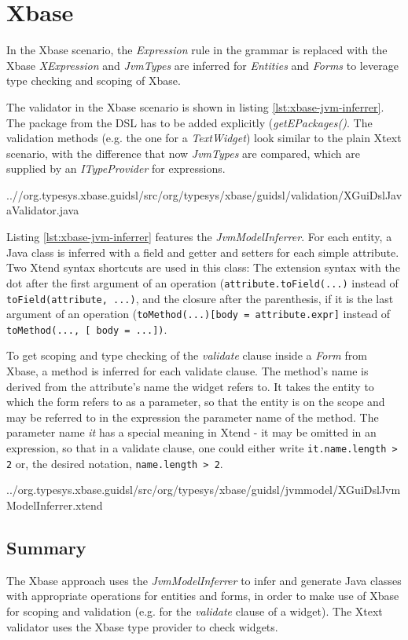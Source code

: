 \section{Xbase}

In the Xbase scenario, the \emph{Expression} rule in the grammar is replaced with the Xbase \emph{XExpression} and \emph{JvmTypes} are inferred for \emph{Entities} and \emph{Forms} to leverage type checking and scoping of Xbase.

The validator in the Xbase scenario is shown in listing \ref{lst:xbase-jvm-inferrer}. The package from the DSL has to be added explicitly (\emph{getEPackages()}. The validation methods (e.g. the one for a \emph{TextWidget}) look similar to the plain Xtext scenario, with the difference that now \emph{JvmTypes} are compared, which are supplied by an \emph{ITypeProvider} for expressions.

	{..//org.typesys.xbase.guidsl/src/org/typesys/xbase/guidsl/validation/XGuiDslJavaValidator.java}

Listing \ref{lst:xbase-jvm-inferrer} features the \emph{JvmModelInferrer}. For each entity, a Java class is inferred with a field and getter and setters for each simple attribute. Two Xtend syntax shortcuts are used in this class: The extension syntax with the dot after the first argument of an operation (\verb|attribute.toField(...)| instead of \verb|toField(attribute, ...)|, and the closure after the parenthesis, if it is the last argument of an operation (\verb|toMethod(...)[body = attribute.expr]| instead of \verb|toMethod(..., [ body = ...])|.

To get scoping and type checking of the \emph{validate} clause inside a \emph{Form} from Xbase, a method is inferred for each validate clause. The method's name is derived from the attribute's name the widget refers to. It takes the entity to which the form refers to as a parameter, so that the entity is on the scope and may be referred to in the expression the parameter name of the method. The parameter name \emph{it} has a special meaning in Xtend - it may be omitted in an expression, so that in a validate clause, one could either write
\verb|it.name.length > 2| or, the desired notation, \verb|name.length > 2|.

	{../org.typesys.xbase.guidsl/src/org/typesys/xbase/guidsl/jvmmodel/XGuiDslJvmModelInferrer.xtend}

\subsection{Summary}
The Xbase approach uses the \emph{JvmModelInferrer} to infer and generate Java classes with appropriate operations for entities and forms, in order to make use of Xbase for scoping and validation (e.g. for the \emph{validate} clause of a widget). The Xtext validator uses the Xbase type provider to check widgets.